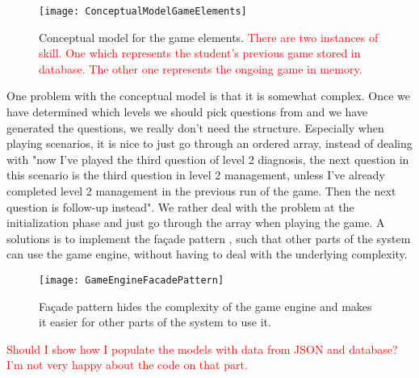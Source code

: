 \begin{figure}[h!]
	\caption {Conceptual model for the game elements. \textcolor{red}{There are two instances of skill. One which represents the student's previous game stored in database. The other one represents the ongoing game in memory.}}
	\label{fig:ConceptualGameElements}
	\texttt{[image: ConceptualModelGameElements]}
\end{figure}

One problem with the conceptual model is that it is somewhat complex. Once we have determined which levels we should pick questions from and we have generated the questions, we really don't need the structure. Especially when playing scenarios, it is nice to just go through an ordered array, instead of dealing with "now I've played the third question of level 2 diagnosis, the next question in this scenario is the third question in level 2 management, unless I've already completed level 2 management in the previous run of the game. Then the next question is follow-up instead". We rather deal with the problem at the initialization phase and just go through the array when playing the game. A solutions is to implement the façade pattern \parencite{Gamma1994}, such that other parts of the system can use the game engine, without having to deal with the underlying complexity. 


\begin{figure}[h!]
	\caption {Façade pattern hides the complexity of the game engine and makes it easier for other parts of the system to use it.}
	\label{fig:GameEngineFacadePattern}
	\texttt{[image: GameEngineFacadePattern]}
\end{figure}

\textcolor{red}{Should I show how I populate the models with data from JSON and database? I'm not very happy about the code on that part.}


